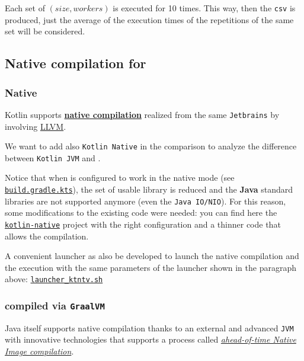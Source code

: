 Each set of $(size, workers)$ is executed for 10 times. This way, then the \texttt{csv} is produced, just the average of the execution times of the repetitions of the same set will be considered.

\subsection{Native compilation for \Kotlin}

\subsubsection{\Kotlin Native}

Kotlin supports \href{https://kotlinlang.org/docs/native-overview.html}{\textbf{native compilation}} realized from the same \texttt{Jetbrains} by involving \href{https://llvm.org/}{LLVM}.

We want to add also \texttt{Kotlin Native} in the comparison to analyze the difference between \texttt{Kotlin JVM} and \Go.

Notice that when \Kotlin is configured to work in the native mode (see \href{https://github.com/LM-96/Activity-Project-Operating-Systems-M-/blob/main/code/kotlin-native/build.gradle.kts}{\texttt{build.gradle.kts}}), the set of usable library is reduced and the \textbf{Java} standard libraries are not supported anymore (even the \texttt{Java IO/NIO}). For this reason, some modifications to the existing \Kotlin code were needed: you can find here the \href{https://github.com/LM-96/Activity-Project-Operating-Systems-M-/tree/main/code/kotlin-native}{\texttt{kotlin-native}} project with the right configuration and a thinner code that allows the compilation.

A convenient launcher as also be developed to launch the native compilation and the execution with the same parameters of the launcher shown in the paragraph above: \href{https://github.com/LM-96/Activity-Project-Operating-Systems-M-/blob/main/code/launcher_ktntv.sh}{\texttt{launcher\_ktntv.sh}}

\subsubsection{\Kotlin compiled via \texttt{GraalVM}}

Java itself supports native compilation thanks to an external and advanced \texttt{JVM} with innovative technologies that supports a process called \href{https://www.graalvm.org/latest/reference-manual/native-image/}{\textit{ahead-of-time Native Image compilation}}.


